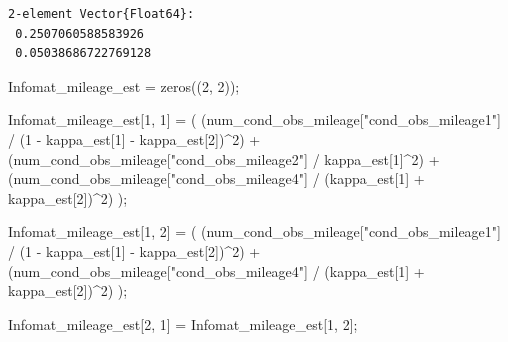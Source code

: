 \documentclass[
  letterpaper,
  DIV=11,
  numbers=noendperiod]{scrreprt}
\newenvironment{Shaded}{\begin{snugshade}}{\end{snugshade}}
\newcommand{\FloatTok}[1]{\textcolor[rgb]{0.68,0.00,0.00}{#1}}
\newcommand{\FunctionTok}[1]{\textcolor[rgb]{0.28,0.35,0.67}{#1}}
\newcommand{\NormalTok}[1]{\textcolor[rgb]{0.00,0.23,0.31}{#1}}
\newcommand{\OperatorTok}[1]{\textcolor[rgb]{0.37,0.37,0.37}{#1}}
\newcommand{\StringTok}[1]{\textcolor[rgb]{0.13,0.47,0.30}{#1}}
\begin{document}
\begin{verbatim}
2-element Vector{Float64}:
 0.2507060588583926
 0.05038686722769128
\end{verbatim}

\begin{Shaded}
\begin{Highlighting}[]
\NormalTok{Infomat\_mileage\_est }\OperatorTok{=} \FunctionTok{zeros}\NormalTok{((}\FloatTok{2}\NormalTok{, }\FloatTok{2}\NormalTok{));}

\NormalTok{Infomat\_mileage\_est[}\FloatTok{1}\NormalTok{, }\FloatTok{1}\NormalTok{] }\OperatorTok{=}\NormalTok{ (}
\NormalTok{    (num\_cond\_obs\_mileage[}\StringTok{"cond\_obs\_mileage1"}\NormalTok{] }\OperatorTok{/}\NormalTok{ (}\FloatTok{1} \OperatorTok{{-}}\NormalTok{ kappa\_est[}\FloatTok{1}\NormalTok{] }\OperatorTok{{-}}\NormalTok{ kappa\_est[}\FloatTok{2}\NormalTok{])}\OperatorTok{\^{}}\FloatTok{2}\NormalTok{) }\OperatorTok{+}
\NormalTok{    (num\_cond\_obs\_mileage[}\StringTok{"cond\_obs\_mileage2"}\NormalTok{] }\OperatorTok{/}\NormalTok{ kappa\_est[}\FloatTok{1}\NormalTok{]}\OperatorTok{\^{}}\FloatTok{2}\NormalTok{) }\OperatorTok{+}
\NormalTok{    (num\_cond\_obs\_mileage[}\StringTok{"cond\_obs\_mileage4"}\NormalTok{] }\OperatorTok{/}\NormalTok{ (kappa\_est[}\FloatTok{1}\NormalTok{] }\OperatorTok{+}\NormalTok{ kappa\_est[}\FloatTok{2}\NormalTok{])}\OperatorTok{\^{}}\FloatTok{2}\NormalTok{)}
\NormalTok{);}

\NormalTok{Infomat\_mileage\_est[}\FloatTok{1}\NormalTok{, }\FloatTok{2}\NormalTok{] }\OperatorTok{=}\NormalTok{ (}
\NormalTok{    (num\_cond\_obs\_mileage[}\StringTok{"cond\_obs\_mileage1"}\NormalTok{] }\OperatorTok{/}\NormalTok{ (}\FloatTok{1} \OperatorTok{{-}}\NormalTok{ kappa\_est[}\FloatTok{1}\NormalTok{] }\OperatorTok{{-}}\NormalTok{ kappa\_est[}\FloatTok{2}\NormalTok{])}\OperatorTok{\^{}}\FloatTok{2}\NormalTok{) }\OperatorTok{+}
\NormalTok{    (num\_cond\_obs\_mileage[}\StringTok{"cond\_obs\_mileage4"}\NormalTok{] }\OperatorTok{/}\NormalTok{ (kappa\_est[}\FloatTok{1}\NormalTok{] }\OperatorTok{+}\NormalTok{ kappa\_est[}\FloatTok{2}\NormalTok{])}\OperatorTok{\^{}}\FloatTok{2}\NormalTok{)}
\NormalTok{);}

\NormalTok{Infomat\_mileage\_est[}\FloatTok{2}\NormalTok{, }\FloatTok{1}\NormalTok{] }\OperatorTok{=}\NormalTok{ Infomat\_mileage\_est[}\FloatTok{1}\NormalTok{, }\FloatTok{2}\NormalTok{];}


\end{Highlighting}
\end{Shaded}
\end{document}
